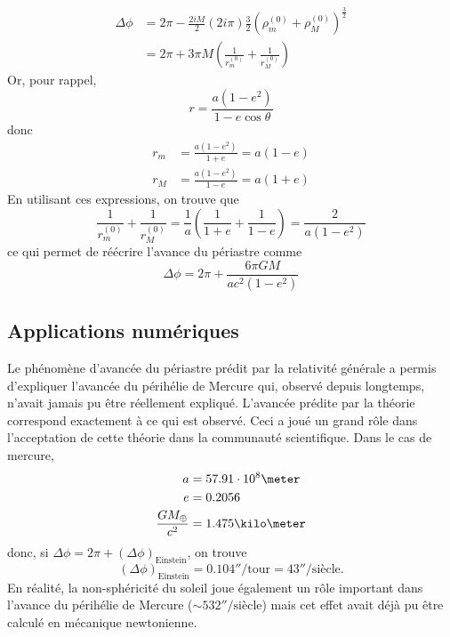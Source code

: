 \documentclass[a4paper,11pt]{report}
\theoremstyle{definition}
\theoremstyle{plain}
\theoremstyle{definition}
\theoremstyle{remark}
\begin{document}
            \begin{align}
                \Delta\phi &= 2\pi-\frac{2iM}{2}(2i\pi)\frac{3}{2}(\rho^{(0)}_m+\rho^{(0)}_M)^{\frac{3}{2}}\\
                &= 2\pi+3\pi M\left( \frac{1}{r^{(0)}_m}+\frac{1}{r^{(0)}_M} \right)
            \end{align}
            Or, pour rappel,
            \begin{equation}
                r = \frac{a(1-e^2)}{1-e\cos\theta}
            \end{equation}
            donc
            \begin{align}
                r_m &= \frac{a(1-e^2)}{1+e} = a(1-e)\\
                r_M &= \frac{a(1-e^2)}{1-e} = a(1+e)
            \end{align}
            En utilisant ces expressions, on trouve que
            \begin{equation}
                \frac{1}{r^{(0)}_m}+\frac{1}{r^{(0)}_M} = \frac{1}{a}\left( \frac{1}{1+e}+\frac{1}{1-e} \right) = \frac{2}{a(1-e^2)}
            \end{equation}
            ce qui permet de réécrire l'avance du périastre comme
            \begin{equation}
                \boxed{\Delta\phi = 2\pi+\frac{6\pi GM}{ac^2(1-e^2)}}
            \end{equation}
            
        \subsection{Applications numériques}
                
            Le phénomène d'avancée du périastre prédit par la relativité générale a permis d'expliquer l'avancée du périhélie de Mercure qui, observé depuis longtemps, n'avait jamais pu être réellement expliqué. L'avancée prédite par la théorie correspond exactement à ce qui est observé. Ceci a joué un grand rôle dans l'acceptation de cette théorie dans la communauté scientifique. Dans le cas de mercure,
            \begin{align}
                a &= 57.91\cdot10^8\meter\\
                e &= 0.2056\\
                \frac{GM_{\oplus}}{c^2} &= 1.475\kilo\meter
            \end{align}
            donc, si $\Delta\phi = 2\pi+(\Delta\phi)_{\text{Einstein}}$, on trouve
            \begin{equation}
                (\Delta\phi)_{\text{Einstein}} = 0.104''/\text{tour} = 43''/\text{siècle}.
            \end{equation}
            En réalité, la non-sphéricité du soleil joue également un rôle important dans l'avance du périhélie de Mercure ($\sim 532''/\text{siècle}$) mais cet effet avait déjà pu être calculé en mécanique newtonienne.\\
            
\end{document}
